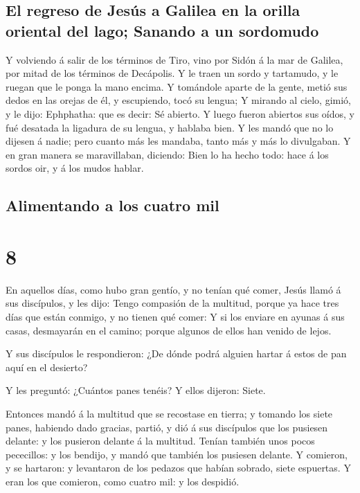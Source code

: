 \hypertarget{el-regreso-de-jesuxfas-a-galilea-en-la-orilla-oriental-del-lago-sanando-a-un-sordomudo}{%
\subsection{El regreso de Jesús a Galilea en la orilla oriental del
lago; Sanando a un
sordomudo}\label{el-regreso-de-jesuxfas-a-galilea-en-la-orilla-oriental-del-lago-sanando-a-un-sordomudo}}

 Y volviendo á salir de los términos de Tiro, vino por
Sidón á la mar de Galilea, por mitad de los términos de Decápolis.
 Y le traen un sordo y tartamudo, y le ruegan que le
ponga la mano encima.  Y tomándole aparte de la gente,
metió sus dedos en las orejas de él, y escupiendo, tocó su lengua;
 Y mirando al cielo, gimió, y le dijo: Ephphatha: que es
decir: Sé abierto.  Y luego fueron abiertos sus oídos, y
fué desatada la ligadura de su lengua, y hablaba bien.  Y
les mandó que no lo dijesen á nadie; pero cuanto más les mandaba, tanto
más y más lo divulgaban.  Y en gran manera se
maravillaban, diciendo: Bien lo ha hecho todo: hace á los sordos oir, y
á los mudos hablar.

\hypertarget{alimentando-a-los-cuatro-mil}{%
\subsection{Alimentando a los cuatro
mil}\label{alimentando-a-los-cuatro-mil}}

\hypertarget{section-7}{%
\section{8}\label{section-7}}

 En aquellos días, como hubo gran gentío, y no tenían qué
comer, Jesús llamó á sus discípulos, y les dijo:  Tengo
compasión de la multitud, porque ya hace tres días que están conmigo, y
no tienen qué comer:  Y si los enviare en ayunas á sus
casas, desmayarán en el camino; porque algunos de ellos han venido de
lejos.

 Y sus discípulos le respondieron: ¿De dónde podrá alguien
hartar á estos de pan aquí en el desierto?

 Y les preguntó: ¿Cuántos panes tenéis? Y ellos dijeron:
Siete.

 Entonces mandó á la multitud que se recostase en tierra;
y tomando los siete panes, habiendo dado gracias, partió, y dió á sus
discípulos que los pusiesen delante: y los pusieron delante á la
multitud.  Tenían también unos pocos pececillos: y los
bendijo, y mandó que también los pusiesen delante.  Y
comieron, y se hartaron: y levantaron de los pedazos que habían sobrado,
siete espuertas.  Y eran los que comieron, como cuatro
mil: y los despidió.

